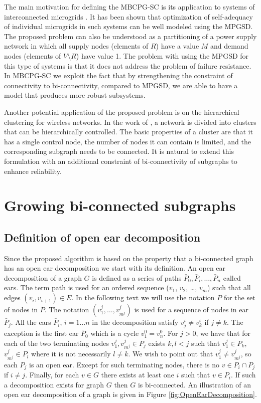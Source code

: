 The main motivation for defining the MBCPG-SC is its application to systems of interconnected microgrids  \citep{MicroGrid}. It has been shown that optimization of self-adequacy of individual microgrids in such systems can be well modeled using the  MPGSD. The proposed problem can also be understood as a partitioning of a power supply network in which all supply nodes (elements of $R$) have a value $M$ and demand nodes (elements of $V \setminus R$) have value 1. The problem with using the MPGSD for this type of systems is that it does not address the problem of failure resistance. In MBCPG-SC we exploit the fact that by strengthening the constraint of connectivity to bi-connectivity, compared to MPGSD, we are able to have a model that produces more robust subsystems. 

Another potential application of the proposed problem is on the hierarchical clustering for wireless networks. In the work of   \citep{banerjee2001clustering}, a network is divided into clusters that can be hierarchically controlled. The basic properties of a cluster are that it has a single control node, the  number of nodes it can contain is limited, and the corresponding  subgraph needs to be connected. It is natural to extend this formulation with an additional constraint of bi-connectivity of  subgraphs to enhance reliability.
 


\section{Growing bi-connected subgraphs}
\subsection{Definition of open ear decomposition}
Since the proposed algorithm is based on the property that a bi-connected graph has an open ear decomposition we start with its definition. An open ear decomposition of a graph $G$ is defined as a series of paths $\bar{P}_0, \bar{P}_i, \dots,\bar{P}_n$ called ears. The term path is used for an ordered sequence ($v_1$, $v_2$, \dots , $v_m$) such that all edges $(v_i,v_{i+1}) \in E$. In the following text we will use the notation $P$ for the set of nodes in $\bar{P}$. The notation $(v^j_1,  \dots,  v^j_{m^j})$ is used for a sequence of nodes in ear $\bar{P}_j$. All the ears $\bar{P}_i$, $i = 1 \dots n$ in the decomposition satisfy  $v^i_j \neq v^i_k$ if $j \neq k$. The exception is the first ear $\bar{P}_0$ which is a cycle $v^0_1 = v^0_n$. For $j>0$, we have that for each of the two terminating nodes $v^j_1, v^j_{m^j} \in P_j$ exists $k,l<j$  such that $v^j_1 \in P_k$, $v^j_{m^j} \in P_l$ where it is not necessarily $l \neq k$. We wish to point out that $v^j_1 \neq v^j_{m^j}$, so each $P_j$ is an open ear. Except for such terminating nodes, there is no $v \in P_i \cap P_j$ if $i \neq j$. Finally, for each $ v \in G$ there exists  at least one $i$ such that $v \in P_i$. If such a decomposition exists for graph $G$ then $G$ is bi-connected. An illustration of an open ear decomposition of a graph is given in Figure \ref{fig:OpenEarDecomposition}. 

